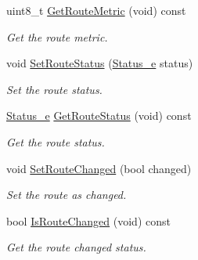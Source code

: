 \begin{DoxyCompactItemize}
uint8\+\_\+t \hyperlink{classns3_1_1RipRoutingTableEntry_a4addacf84245877be319fca603dc7cb9}{Get\+Route\+Metric} (void) const 
\begin{DoxyCompactList}\small\item\em Get the route metric. \end{DoxyCompactList}\item 
void \hyperlink{classns3_1_1RipRoutingTableEntry_a3ec44473d5fbeeddeb111fe9964d6adc}{Set\+Route\+Status} (\hyperlink{classns3_1_1RipRoutingTableEntry_a4326145be5c3027f2ddf9eb80b6127a4}{Status\+\_\+e} status)
\begin{DoxyCompactList}\small\item\em Set the route status. \end{DoxyCompactList}\item 
\hyperlink{classns3_1_1RipRoutingTableEntry_a4326145be5c3027f2ddf9eb80b6127a4}{Status\+\_\+e} \hyperlink{classns3_1_1RipRoutingTableEntry_a3e57c8ab1727d009e85b17a0901db967}{Get\+Route\+Status} (void) const 
\begin{DoxyCompactList}\small\item\em Get the route status. \end{DoxyCompactList}\item 
void \hyperlink{classns3_1_1RipRoutingTableEntry_aa0914dbb327830d3d4e9f5707a0f1f5c}{Set\+Route\+Changed} (bool changed)
\begin{DoxyCompactList}\small\item\em Set the route as changed. \end{DoxyCompactList}\item 
bool \hyperlink{classns3_1_1RipRoutingTableEntry_adb9bff66dd15e3e969867d144bbbe3a6}{Is\+Route\+Changed} (void) const 
\begin{DoxyCompactList}\small\item\em Get the route changed status. \end{DoxyCompactList}\end{DoxyCompactItemize}
